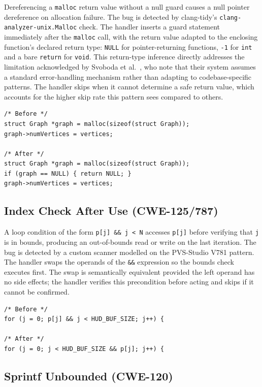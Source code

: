 \documentclass[conference]{IEEEtran}
\begin{document}
Dereferencing a \texttt{malloc} return value without a null guard causes a null
pointer dereference on allocation failure. The bug is detected by clang-tidy's
\texttt{clang-analyzer-unix.Malloc} check. The handler inserts a guard statement
immediately after the \texttt{malloc} call, with the return value adapted to the
enclosing function's declared return type: \texttt{NULL} for pointer-returning
functions, \texttt{-1} for \texttt{int} and a bare \texttt{return} for \texttt{void}.
This return-type inference directly addresses the limitation acknowledged by
Svoboda et al.~\cite{b2}, who note that their system assumes a standard
error-handling mechanism rather than adapting to codebase-specific patterns.
The handler skips when it cannot determine a safe return value, which accounts
for the higher skip rate this pattern sees compared to others.

\begin{lstlisting}[caption={CWE-690 fix: bfs.c (TheAlgorithms/C)}]
/* Before */
struct Graph *graph = malloc(sizeof(struct Graph));
graph->numVertices = vertices;

/* After */
struct Graph *graph = malloc(sizeof(struct Graph));
if (graph == NULL) { return NULL; }
graph->numVertices = vertices;
\end{lstlisting}

\subsection{Index Check After Use (CWE-125/787)}

A loop condition of the form \texttt{p[j] \&\& j < N} accesses \texttt{p[j]}
before verifying that \texttt{j} is in bounds, producing an out-of-bounds read
or write on the last iteration. The bug is detected by a custom scanner modelled
on the PVS-Studio V781 pattern. The handler swaps the operands of the \texttt{\&\&}
expression so the bounds check executes first. The swap is semantically equivalent
provided the left operand has no side effects; the handler verifies this precondition
before acting and skips if it cannot be confirmed.

\begin{lstlisting}[caption={CWE-125/787 fix: hud.c (radareorg/radare2)}]
/* Before */
for (j = 0; p[j] && j < HUD_BUF_SIZE; j++) {

/* After */
for (j = 0; j < HUD_BUF_SIZE && p[j]; j++) {
\end{lstlisting}

\subsection{Sprintf Unbounded (CWE-120)}
\end{document}
